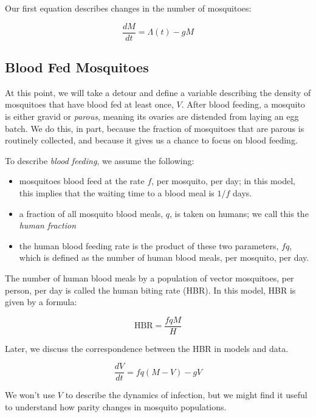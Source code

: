 \documentclass[
]{book}
\begin{document}
Our first equation describes changes in the number of mosquitoes:

\begin{equation}
\frac{dM}{dt} = \Lambda(t) - g M
\end{equation}

\hypertarget{blood-fed-mosquitoes}{%
\subsection{Blood Fed Mosquitoes}\label{blood-fed-mosquitoes}}

At this point, we will take a detour and define a variable describing the density of mosquitoes that have blood fed at least once, \(V\). After blood feeding, a mosquito is either gravid or \emph{parous}, meaning its ovaries are distended from laying an egg batch. We do this, in part, because the fraction of mosquitoes that are parous is routinely collected, and because it gives us a chance to focus on blood feeding.

To describe \emph{blood feeding}, we assume the following:

\begin{itemize}
\item
  mosquitoes blood feed at the rate \(f\), per mosquito, per day; in this model, this implies that the waiting time to a blood meal is \(1/f\) days.
\item
  a fraction of all mosquito blood meals, \(q\), is taken on humans; we call this the \emph{human fraction}
\item
  the human blood feeding rate is the product of these two parameters, \(fq\), which is defined as the number of human blood meals, per mosquito, per day.
\end{itemize}

The number of human blood meals by a population of vector mosquitoes, per person, per day is called the human biting rate (HBR). In this model, HBR is given by a formula:

\[\mbox{HBR} = \frac{fqM}{H}\]

Later, we discuss the correspondence between the HBR in models and data.

\begin{equation}
\frac{dV}{dt} = f q (M-V) - g V
\end{equation}

We won't use \(V\) to describe the dynamics of infection, but we might find it useful to understand how parity changes in mosquito populations.
\end{document}
